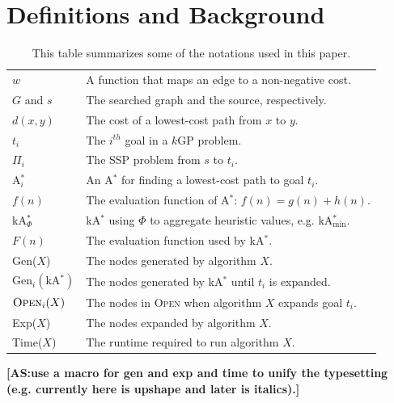 \documentclass[twoside,11pt]{article}
\newcommand{\kgs}{$k$GP\xspace}
\newcommand{\astar}{A$^*$\xspace}
\newcommand{\kastar}{kA$^*$\xspace}
\newcommand{\kastarvar}[1]{\textup{kA}$^*_{#1}$\xspace}
\newcommand{\kastarmin}{\kastarvar{\min}}
\newcommand{\kastarphi}{\textup{kA}$^*_{\Phi}$\xspace}
\newcommand{\astari}[1]{A$^*_#1$\xspace}
\newcommand{\minf}{$F_{min}(n)$\xspace}
\newcommand{\open}{\textsc{Open}\xspace}
\newcommand{\roni}[1]{\textbf{[RS:#1]}}
\newcommand{\abda}[1]{\textbf{[AS:#1]}}
\begin{document}

\section{Definitions and Background}



\begin{table}
  \centering
  \caption{This table summarizes some of the notations used in this paper.}
  \label{tab:notations}
  \footnotesize
  \begin{tabular}{|l|m{78mm}|}
    \hline
    $w$         & A function that maps an edge to a non-negative cost.  \\
    $G$ and $s$ & The searched graph and the source, respectively. \\
    $d(x, y)$   & The cost of a lowest-cost path from $x$ to $y$. \\
    $t_i$       & The $i^{th}$ goal in a \kgs problem. \\
    $\Pi_i$     & The SSP problem from $s$ to $t_i$. \\
    \astari{i}  & An \astar for finding a lowest-cost path to goal $t_i$. \\
    $f(n)$      & The evaluation function of \astar: $f(n)=g(n)+h(n)$. \\
    \kastarphi  & \kastar using $\Phi$ to aggregate heuristic values, e.g. \kastarmin.\\
    $F(n)$      & The evaluation function used by \kastar. \\
    Gen($X$)    & The nodes generated by algorithm $X$. \\
    Gen$_i(\text{\kastar})$ & The nodes generated by \kastar until $t_i$ is expanded. \\
    $\open_i(X)$ & The nodes in \open when algorithm $X$ expands goal $t_i$.\\
    Exp($X$)    & The nodes expanded by algorithm $X$. \\
    Time($X$)   & The runtime required to run algorithm $X$. \\
    \hline
  \end{tabular}

  \abda{use a macro for gen and exp and time to unify the typesetting (e.g. currently here is upshape and later is italics).}
\end{table}
\end{document}
